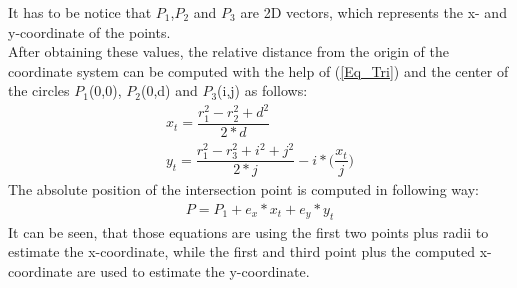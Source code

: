 It has to be notice that $P_1$,$P_2$  and $P_3$ are 2D vectors, which represents the x- and y-coordinate of the points.\\ 
After obtaining these values, the relative distance from the origin of the coordinate system can be computed with the help of (\ref{Eq_Tri}) and the center of the circles $P_1$(0,0), $P_2$(0,d) and $P_3$(i,j) as follows:
\begin{align}
x_t = \dfrac{r_1^2 - r_2^2 + d^2}{2*d} \\
y_t = \dfrac{r_1^2 - r_3^2 + i^2 + j^2}{2*j} - i* \bigg(\dfrac{x_t}{j}\bigg) 
\end{align}
The absolute position of the intersection point is computed in following way:
\begin{align}
P = P_1 + e_x * x_t + e_y * y_t 
\end{align}
It can be seen, that those equations are using the first two points plus radii to estimate the x-coordinate, while the first and third point plus the computed x-coordinate are used to estimate the y-coordinate.\\ 
